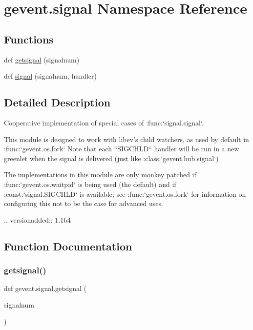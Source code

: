 \hypertarget{namespacegevent_1_1signal}{}\section{gevent.\+signal Namespace Reference}
\label{namespacegevent_1_1signal}
\subsection*{Functions}
\begin{DoxyCompactItemize}
\item 
def \hyperlink{namespacegevent_1_1signal_aa1e0eb06ffc2dc984f38f81a695000a1}{getsignal} (signalnum)
\item 
def \hyperlink{namespacegevent_1_1signal_a9a9468db1089a9857115dba958e5f26e}{signal} (signalnum, handler)
\end{DoxyCompactItemize}


\subsection{Detailed Description}
\begin{DoxyVerb}Cooperative implementation of special cases of :func:`signal.signal`.

This module is designed to work with libev's child watchers, as used
by default in :func:`gevent.os.fork` Note that each ``SIGCHLD`` handler
will be run in a new greenlet when the signal is delivered (just like
:class:`gevent.hub.signal`)

The implementations in this module are only monkey patched if
:func:`gevent.os.waitpid` is being used (the default) and if
:const:`signal.SIGCHLD` is available; see :func:`gevent.os.fork` for
information on configuring this not to be the case for advanced uses.

.. versionadded:: 1.1b4
\end{DoxyVerb}
 

\subsection{Function Documentation}
\mbox{\label{namespacegevent_1_1signal_aa1e0eb06ffc2dc984f38f81a695000a1}} 
\subsubsection{\texorpdfstring{getsignal()}{getsignal()}}
{\footnotesize\ttfamily def gevent.\+signal.\+getsignal (\begin{DoxyParamCaption}\item[{}]{signalnum }\end{DoxyParamCaption})}

